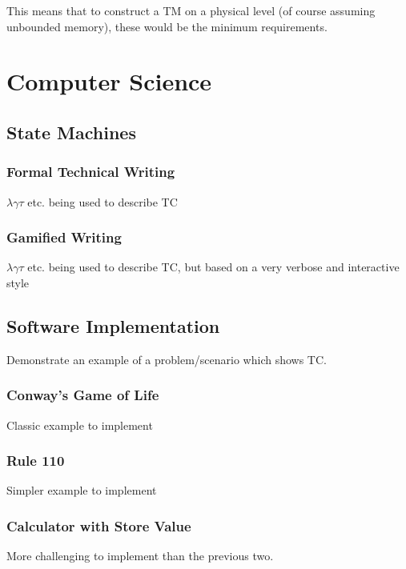 This means that to construct a TM on a physical level (of course assuming unbounded memory), these would be the minimum requirements.

\section{Computer Science}

\subsection{State Machines}

\subsubsection{Formal Technical Writing}

$\lambda \gamma \tau $ etc. being used to describe TC

\subsubsection{Gamified Writing}

$\lambda \gamma \tau $ etc. being used to describe TC, but based on a very verbose and interactive style

\subsection{Software Implementation}

Demonstrate an example of a problem/scenario which shows TC.

\subsubsection{Conway's Game of Life}\label{subsubsec:CGoL}

Classic example to implement

\subsubsection{Rule 110}

Simpler example to implement

\subsubsection{Calculator with Store Value}

More challenging to implement than the previous two.

